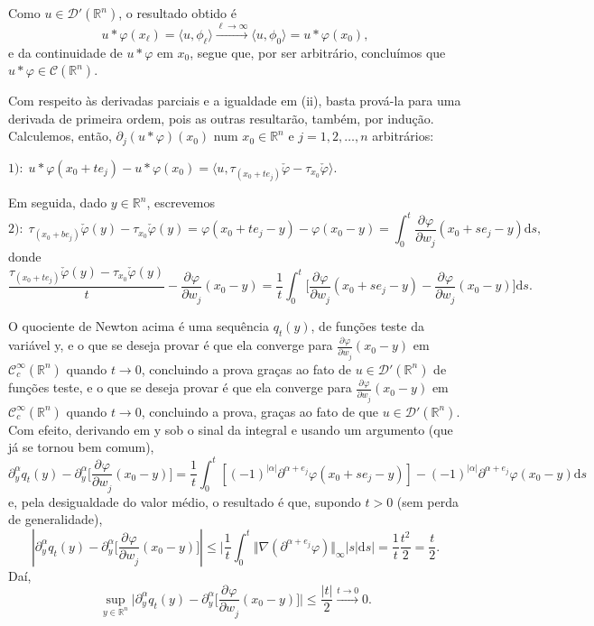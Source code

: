 \documentclass[../distribution_theory_notes.tex]{subfiles}
\begin{document}
\begin{proof*}
	Como \(u\in \mathcal{D}'(\mathbb{R}^{n})\), o resultado obtido é
	\[
		u*\varphi (x_{\ell}) = \langle u, \phi_{\ell} \rangle\stackrel{\ell \to \infty}\rightarrow \langle u, \phi_0 \rangle = u * \varphi(x_{0}),
	\]
	e da continuidade de \(u*\varphi \) em \(x_{0}\), segue que, por ser arbitrário, concluímos que \(u*\varphi \in \mathcal{C}(\mathbb{R}^{n})\).

	Com respeito às derivadas parciais e a igualdade em (ii), basta prová-la para uma derivada de primeira ordem, pois as outras resultarão, também, por indução. Calculemos, então, \(\partial_{j}(u*\varphi )(x_{0})\) num \(x_{0}\in \mathbb{R}^{n}\) e \(j= 1, 2, \dotsc , n\) arbitrários:

	\(1):\; u*\varphi (x_{0}+te_{j}) - u*\varphi (x_{0}) = \langle u, \tau_{(x_{0}+te_{j})}\check{\varphi } - \tau_{x_{0}}\check{\varphi }\rangle\).

	Em seguida, dado \(y\in \mathbb{R}^{n}\), escrevemos
	\[
		2):\; \tau_{(x_{0}+be_{j})}\check{\varphi }(y) - \tau_{x_{0}}\check{\varphi }(y) = \varphi(x_{0}+te_{j}-y) - \varphi(x_{0}-y) = \int_{0}^{t}\frac{\partial^{}\varphi }{\partial w_{j}^{}}(x_{0}+se_{j}-y) \mathrm{d}s,
	\]
	donde
	\[
		\frac{\tau_{(x_{0}+te_{j})}\check{\varphi}(y) - \tau_{x_{0}}\check{\varphi }(y)}{t} - \frac{\partial^{}\varphi }{\partial w_{j}^{}}(x_{0}-y) = \frac{1}{t}\int_{0}^{t}\biggl[\frac{\partial^{}\varphi }{\partial w_{j}^{}}(x_{0}+se_{j}-y) - \frac{\partial^{}\varphi }{\partial w_{j}^{}}(x_{0}-y)\biggr] \mathrm{d}s.
	\]

	O quociente de Newton acima é uma sequência \(q_{t}(y)\), de funções teste da variável y, e o que se deseja provar é que ela converge para \(\frac{\partial^{}\varphi }{\partial w_{j}^{}}(x_{0}-y)\) em \(\mathcal{C}_{c}^{\infty}(\mathbb{R}^{n})\) quando \(t\to 0\), concluindo a prova graças ao fato de \(u\in \mathcal{D}'(\mathbb{R}^{n})\) de funções teste, e o que se deseja provar é que ela converge para
	\(\frac{\partial^{}\varphi }{\partial w_{j}^{}}(x_{0}-y)\) em \(\mathcal{C}_{c}^{\infty}(\mathbb{R}^{n})\) quando \(t\to 0\), concluindo a prova, graças ao fato de que \(u\in \mathcal{D}'(\mathbb{R}^{n})\). Com efeito, derivando em y sob o sinal da integral e usando um argumento (que já se tornou bem comum),
	\[
		\partial_{y}^{\alpha }q_{t}(y) - \partial_{y}^{\alpha }\biggl[\frac{\partial^{}\varphi }{\partial w_{j}^{}}(x_{0}-y)\biggr] = \frac{1}{t}\int_{0}^{t}[(-1)^{| \alpha  |}\partial^{\alpha +e_{j}}\varphi(x_{0}+se_{j}-y)]-(-1)^{| \alpha  |}\partial^{\alpha +e_{j}}\varphi(x_{0}-y) \mathrm{d}s
	\]
	e, pela desigualdade do valor médio, o resultado é que, supondo \(t > 0\) (sem perda de generalidade),
	\[
		| \partial_{y}^{\alpha }q_{t}(y) - \partial_{y}^{\alpha }\biggl[\frac{\partial^{}\varphi }{\partial w_{j}^{}}(x_{0}-y)\biggr] | \leq \biggl\vert \frac{1}{t}\int_{0}^{t}\Vert \nabla (\partial^{\alpha +e_{j}}\varphi ) \Vert_{\infty}| s | \mathrm{d}s \biggr\vert = \frac{1}{t}\frac{t^{2}}{2} = \frac{t}{2}.
	\]
	Daí,
	\[
		\sup_{y\in \mathbb{R}^{n}}\biggl\vert \partial_{y}^{\alpha }q_{t}(y) - \partial_{y}^{\alpha }\biggl[\frac{\partial^{}\varphi }{\partial w_{j}^{}}(x_{0}-y)\biggr] \biggr\vert\leq \frac{| t |}{2}\stackrel{t\to 0}\rightarrow 0.
	\]


\end{proof*}
\end{document}

